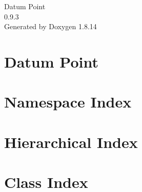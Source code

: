 \documentclass[twoside]{book}
\newcommand{\+}{\discretionary{\mbox{\scriptsize$\hookleftarrow$}}{}{}}
\newcommand{\clearemptydoublepage}{%
  \newpage{\pagestyle{empty}\cleardoublepage}%
}
\begin{document}
\hypersetup{pageanchor=false,
             bookmarksnumbered=true,
             pdfencoding=unicode
            }
\begin{titlepage}
\vspace*{7cm}
\begin{center}%
{\Large Datum Point \\[1ex]\large 0.\+9.\+3 }\\
\vspace*{1cm}
{\large Generated by Doxygen 1.8.14}\\
\end{center}
\end{titlepage}
\clearemptydoublepage
{}
\tableofcontents
\clearemptydoublepage
{}
\hypersetup{pageanchor=true}

\chapter{Datum Point}
\label{md__d_1__work__git_hub_datum-point__r_e_a_d_m_e}

\chapter{Namespace Index}

\chapter{Hierarchical Index}

\chapter{Class Index}

\end{document}
